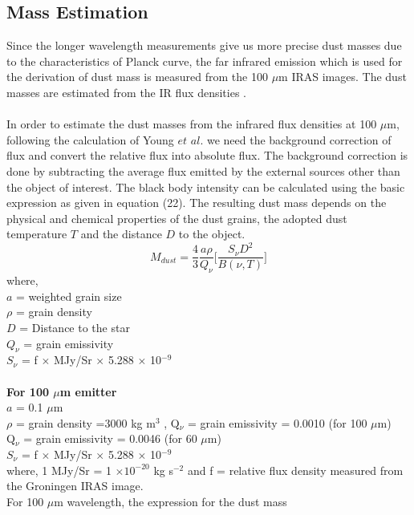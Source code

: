 \documentclass[fleqn,a4paper,12pt,oneside]{article}
\begin{document}
\subsection{Mass Estimation}
Since the longer wavelength measurements give us more precise dust
masses due to the characteristics of  Planck curve, the far
infrared emission which is used for the derivation of  dust
mass is measured from the 100 $\mu$m IRAS images.  The dust masses
are estimated from the IR flux densities \cite{38}.
\\
\\
In order to estimate the dust masses from the infrared flux
densities at 100 $\mu$m, following the calculation of Young $et$
$al.$\cite{39} we need the background correction of flux and
convert the relative flux into absolute flux. The background
correction is done by subtracting the average flux emitted by the
external sources other than the object of interest. The black body
intensity can be calculated using the basic expression as given in
equation (22). The resulting dust mass depends on the physical
and chemical properties of the dust grains, the adopted dust
temperature $T$ and the distance $D$ to the object.
\begin{equation}\label{9}
M_{dust} = \frac{4}{{3}}\frac{a\rho}{{Q_{\nu}}}\bigg[\frac{S_{\nu}D^{2}}{{B(\nu, T)}}\bigg]
\end{equation}
where,\\
$a$ = weighted grain size\\
$\rho$ = grain density \\
$D$ = Distance to the star\\
$ Q_{\nu}$ = grain emissivity\\
$ S_{\nu}$ = f $\times$ MJy/Sr $\times$ 5.288 $\times$ 10$^{-9}$
\\
\\
\textbf{For 100 $\mu$m emitter}
\\
$a$ = 0.1 $\mu$m\\
$\rho$ = grain density =3000 kg m$^{3}$ ,
Q$_{\nu}$ = grain emissivity = 0.0010 (for 100 $\mu$m)\\
Q$_{\nu}$ = grain emissivity = 0.0046 (for 60 $\mu$m)
\cite{39}\\
$ S_{\nu}$ = f $\times$ MJy/Sr $\times$ 5.288 $\times$ 10$^{-9}$\\
where, 1 MJy/Sr = 1 $\times 10^{-20}$ kg s$^{-2}$ and f = relative
flux density measured from the Groningen IRAS image\cite{41}.\\
For 100 $\mu$m wavelength, the expression for the dust mass
\end{document}
